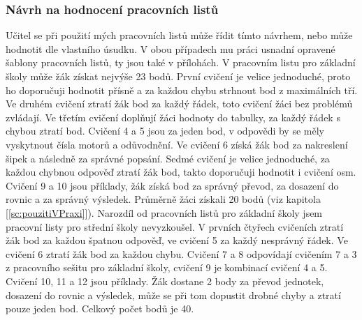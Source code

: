 \subsubsection{Návrh na hodnocení pracovních listů}
{Učitel se při použití mých pracovních listů může řídit tímto návrhem, nebo může hodnotit dle vlastního úsudku. V obou případech mu práci usnadní opravené šablony pracovních listů, ty jsou také v přílohách.}\odst
{V pracovním listu pro základní školy může žák získat nejvýše 23 bodů. První cvičení je velice jednoduché, proto ho doporučuji hodnotit přísně a za každou chybu strhnout bod z maximálních tří. Ve druhém cvičení ztratí žák bod za každý řádek, toto cvičení žáci bez problémů zvládají. Ve třetím cvičení doplňují žáci hodnoty do tabulky, za každý řádek s chybou ztratí bod. Cvičení 4 a 5 jsou za jeden bod, v odpovědi by se měly vyskytnout čísla motorů a odůvodnění. Ve cvičení 6 získá žák bod za nakreslení šipek a následně za správné popsání. Sedmé cvičení je velice jednoduché, za každou chybnou odpověď ztratí žák bod, takto doporučuji hodnotit i cvičení osm. Cvičení 9 a 10 jsou příklady, žák získá bod za správný převod, za dosazení do rovnic a za správný výsledek. Průměrně žáci získali 20 bodů (viz kapitola  [\ref{sc:pouzitiVPraxi}]).}\odst
{Narozdíl od pracovních listů pro základní školy jsem pracovní listy pro střední školy nevyzkoušel. V prvních čtyřech cvičeních ztratí žák bod za každou špatnou odpověď, ve cvičení 5 za každý nesprávný řádek. Ve cvičení 6 ztratí žák bod za každou chybu. Cvičení 7 a 8 odpovídají cvičením 7 a 3 z pracovního sešitu pro základní školy, cvičení 9 je kombinací cvičení 4 a 5. Cvičení 10, 11 a 12 jsou příklady. Žák dostane 2 body za převod jednotek, dosazení do rovnic a výsledek, může se při tom dopustit drobné chyby a ztratí pouze jeden bod. Celkový počet bodů je 40.}
\newpage
